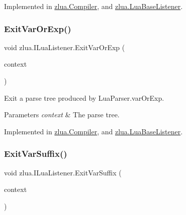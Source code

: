 Implemented in \mbox{\hyperlink{classzlua_1_1_compiler_aeec0bb5231adbd6068558564536bc95e}{zlua.\+Compiler}}, and \mbox{\hyperlink{classzlua_1_1_lua_base_listener_ad18289513e8ed51c9505bf21aa5c7523}{zlua.\+Lua\+Base\+Listener}}.

\mbox{\label{interfacezlua_1_1_i_lua_listener_a0c463bdafad827e9a749f5276a7bb7df}} 
\subsubsection{\texorpdfstring{Exit\+Var\+Or\+Exp()}{ExitVarOrExp()}}
{\footnotesize\ttfamily void zlua.\+I\+Lua\+Listener.\+Exit\+Var\+Or\+Exp (\begin{DoxyParamCaption}\item[{\mbox{[}\+Not\+Null\mbox{]} \mbox{\hyperlink{classzlua_1_1_lua_parser_1_1_var_or_exp_context}{Lua\+Parser.\+Var\+Or\+Exp\+Context}}}]{context }\end{DoxyParamCaption})}



Exit a parse tree produced by Lua\+Parser.\+var\+Or\+Exp. 


\begin{DoxyParams}{Parameters}
{\em context} & The parse tree.\\
\hline
\end{DoxyParams}


Implemented in \mbox{\hyperlink{classzlua_1_1_compiler_abdab8a4aa0e213706786e7238295259a}{zlua.\+Compiler}}, and \mbox{\hyperlink{classzlua_1_1_lua_base_listener_a741486bd709e9d345238f2f706e4e44b}{zlua.\+Lua\+Base\+Listener}}.

\mbox{\label{interfacezlua_1_1_i_lua_listener_a6445ba070fc2f85e9a4ca3caf3a75d0b}} 
\subsubsection{\texorpdfstring{Exit\+Var\+Suffix()}{ExitVarSuffix()}}
{\footnotesize\ttfamily void zlua.\+I\+Lua\+Listener.\+Exit\+Var\+Suffix (\begin{DoxyParamCaption}\item[{\mbox{[}\+Not\+Null\mbox{]} \mbox{\hyperlink{classzlua_1_1_lua_parser_1_1_var_suffix_context}{Lua\+Parser.\+Var\+Suffix\+Context}}}]{context }\end{DoxyParamCaption})}



